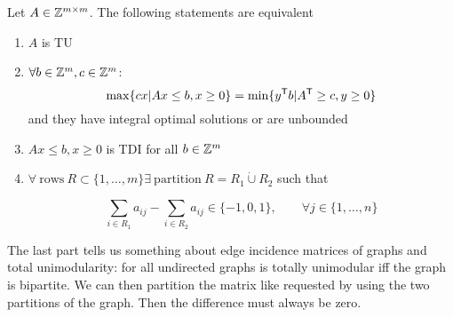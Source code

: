 
\begin{thm} Let $A\in \mathbb{Z}^{m\times m}$. The following statements are equivalent
\begin{enumerate}
\item $A$ is TU
\item $\forall b \in \mathbb{Z}^m, c\in \mathbb{Z}^m$:
\[\max \{cx|Ax\leq b, x\geq 0\} = \min \{{y}^\text{\upshape \sffamily T} b|{A}^\text{\upshape \sffamily T} \geq c, y\geq 0\}\]
and they have integral optimal solutions or are unbounded
\item $Ax\leq b, x\geq 0$ is TDI for all $b\in \mathbb{Z}^m$
\item $\forall\ \text{rows}\ R\subset \{1,\ldots, m\} \exists\ \text{partition}\ R = R_1 \dot \cup R_2$ such that

\[\sum_{i\in R_1} a_{ij} - \sum_{i\in R_2} a_{ij} \in \{-1,0,1\}, \qquad \forall j\in \{1,\ldots, n\}\]
\end{enumerate}
\end{thm}

The last part tells us something about edge incidence matrices of graphs and total unimodularity: for all undirected graphs is totally unimodular iff the graph is bipartite. We can then partition the matrix like requested by using the two partitions of the graph. Then the difference must always be zero.